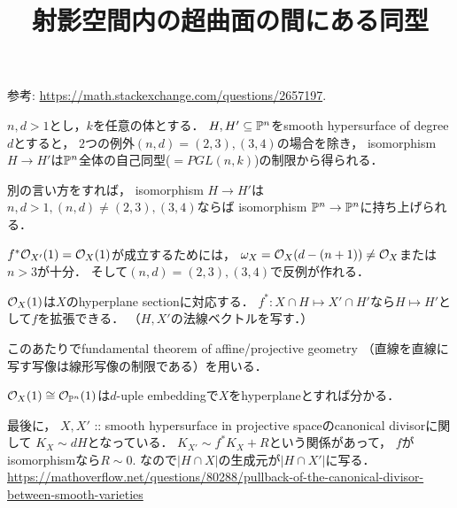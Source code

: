 \documentclass[a4paper]{jarticle}
\title{射影空間内の超曲面の間にある同型}
\begin{document}
\maketitle

参考: \url{https://math.stackexchange.com/questions/2657197}.
\begin{Thm}
    $n,d > 1$とし，$k$を任意の体とする．
    $H, H' \subseteq \mathbb{P}^n$をsmooth hypersurface of degree $d$とすると，
    $2$つの例外$(n,d)=(2,3), (3,4)$の場合を除き，
    isomorphism $H \to H'$は$\mathbb{P}^n$全体の自己同型($=PGL(n, k)$)の制限から得られる．
\end{Thm}
別の言い方をすれば，
isomorphism $H \to H'$は
$n,d>1, (n,d) \neq (2,3), (3,4)$ならば
isomorphism $\mathbb{P}^n \to \mathbb{P}^n$に持ち上げられる．

$f^* \mathcal{O}_{X'}(1)=\mathcal{O}_X(1)$が成立するためには，
$\omega_X=\mathcal{O}_{X}(d-(n+1)) \neq \mathcal{O}_X$または
$n>3$が十分．
そして$(n,d)=(2,3), (3,4)$で反例が作れる．

$\mathcal{O}_X(1)$は$X$のhyperplane sectionに対応する．
$f^*:X \cap H \mapsto X' \cap H'$なら$H \mapsto H'$として$f$を拡張できる．
（$H, X'$の法線ベクトルを写す．）

このあたりでfundamental theorem of affine/projective geometry
（直線を直線に写す写像は線形写像の制限である）を用いる．

$\mathcal{O}_X(1) \cong \mathcal{O}_{\mathbb{P}^n}(1)$は$d$-uple embeddingで$X$をhyperplaneとすれば分かる．

最後に，
$X, X'$ :: smooth hypersurface in projective spaceのcanonical divisorに関して
$K_X \sim dH$となっている．
$K_{X'} \sim f^* K_{X}+R$という関係があって，
$f$がisomorphismなら$R \sim 0$.
なので$|H \cap X|$の生成元が$|H \cap X'|$に写る．
\url{https://mathoverflow.net/questions/80288/pullback-of-the-canonical-divisor-between-smooth-varieties}
\end{document}
